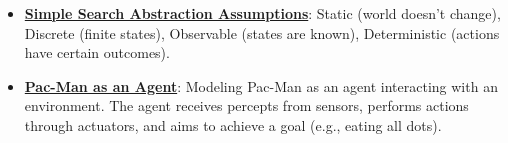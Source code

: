\documentclass{article}%
\begin{document}
\begin{itemize}[leftmargin=*]
\item \href{https://purdue.brightspace.com/d2l/common/assets/pdfjs-d2l-dist/1.0.14-legacy/web/viewer.html?file=\%2Fcontent\%2Fenforced\%2F1095467-wl.202510.CS.24300.001\%2F14L1-DepthFS.pdf\%3Fou\%3D1095467\&lang=en-us\&container=d2l-fileviewer-rendered-pdf\&fullscreen=d2l-fileviewer-rendered-pdf-dialog\&height=667#page=34}{\textbf{Simple Search Abstraction Assumptions}}: Static (world doesn't change), Discrete (finite states), Observable (states are known), Deterministic (actions have certain outcomes).%
\item \href{https://purdue.brightspace.com/d2l/common/assets/pdfjs-d2l-dist/1.0.14-legacy/web/viewer.html?file=\%2Fcontent\%2Fenforced\%2F1095467-wl.202510.CS.24300.001\%2F14L1-DepthFS.pdf\%3Fou\%3D1095467\&lang=en-us\&container=d2l-fileviewer-rendered-pdf\&fullscreen=d2l-fileviewer-rendered-pdf-dialog\&height=667#page=35}{\textbf{Pac-Man as an Agent}}: Modeling Pac-Man as an agent interacting with an environment. The agent receives percepts from sensors, performs actions through actuators, and aims to achieve a goal (e.g., eating all dots).%
\end{itemize}

%
\end{document}
